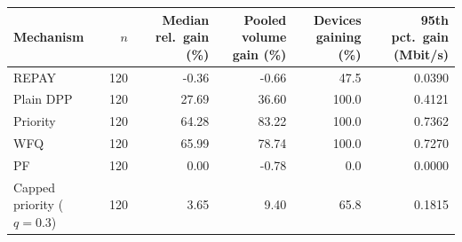 \begin{tabular}{lrrrrr}
\toprule
Mechanism & $n$ & Median rel.\ gain (\%) & Pooled volume gain (\%) & Devices gaining (\%) & 95th pct.\ gain (Mbit/s) \\
\midrule
REPAY & 120 & -0.36 & -0.66 & 47.5 & 0.0390 \\
Plain DPP & 120 & 27.69 & 36.60 & 100.0 & 0.4121 \\
Priority & 120 & 64.28 & 83.22 & 100.0 & 0.7362 \\
WFQ & 120 & 65.99 & 78.74 & 100.0 & 0.7270 \\
PF & 120 & 0.00 & -0.78 & 0.0 & 0.0000 \\
Capped priority ($q=0.3$) & 120 & 3.65 & 9.40 & 65.8 & 0.1815 \\
\bottomrule
\end{tabular}
